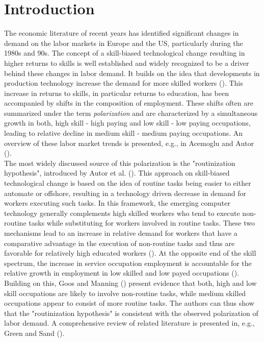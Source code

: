 \documentclass[../main.tex]{subfiles}
\begin{document}
\section{Introduction}
\label{sec:introduction}
The economic literature of recent years has identified significant changes in demand on the labor markets in Europe and the US, particularly during the 1980s and 90s. The concept of a skill-biased technological change resulting in higher returns to skills is well established and widely recognized to be a driver behind these changes in labor demand. It builds on the idea that developments in production technology increase the demand for more skilled workers (\cite{acemoglu2011skills}).
This increase in returns to skills, in particular returns to education, has been accompanied by shifts in the composition of employment. These shifts often are summarized under the term \textit{polarization} and are characterized by a simultaneous growth in both, high skill - high paying and low skill - low paying occupations, leading to relative decline in medium skill - medium paying occupations. An overview of these labor market trends is presented, e.g., in Acemoglu and Autor (\citeyear{acemoglu2011skills}).
\\
The most widely discussed source of this polarization is the "routinization hypothesis", introduced by Autor et al. (\citeyear{autor2003skill}). This approach on skill-biased technological change is based on the idea of routine tasks being easier to either automate or offshore, resulting in a technology driven decrease in demand for workers executing such tasks. In this framework, the emerging computer technology generally complements high skilled workers who tend to execute non-routine tasks while substituting for workers involved in routine tasks. These two mechanisms lead to an increase in relative demand for workers that have a comparative advantage in the execution of non-routine tasks and thus are favorable for relatively high educated workers (\cite{autor2003skill}). At the opposite end of the skill spectrum, the increase in service occupation employment is accountable for the relative growth in employment in low skilled and low payed occupations (\cite{autor2010inequality}). Building on this, Goos and Manning (\citeyear{goos2007lousy}) present evidence that both, high and low skill occupations are likely to involve non-routine tasks, while medium skilled occupations appear to consist of more routine tasks. The authors can thus show that the "routinization hypothesis" is consistent with the observed polarization of labor demand. A comprehensive review of related literature is presented in, e.g., Green and Sand (\citeyear{green2015has}).
\end{document}
